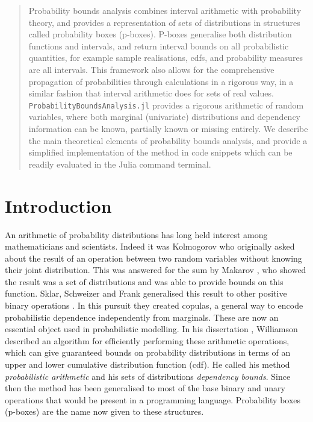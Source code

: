 \documentclass{juliacon}
\begin{document}


\maketitle

\begin{abstract}

Probability bounds analysis combines interval arithmetic with probability theory, and provides a representation of sets of distributions in structures called probability boxes (p-boxes). P-boxes generalise both distribution functions and intervals, and return interval bounds on all probabilistic quantities, for example sample realisations, cdfs, and probability measures are all intervals. This framework also allows for the comprehensive propagation of probabilities through calculations in a rigorous way, in a similar fashion that interval arithmetic does for sets of real values. \texttt{ProbabilityBoundsAnalysis.jl} provides a rigorous arithmetic of random variables, where both marginal (univariate) distributions and dependency information can be known, partially known or missing entirely. We describe the main theoretical elements of probability bounds analysis, and provide a simplified implementation of the method in code snippets which can be readily evaluated in the Julia command terminal.
\end{abstract}

\section{Introduction}
\label{sec:intro}
An arithmetic of probability distributions has long held interest among mathematicians and scientists. Indeed it was Kolmogorov who originally asked about the result of an operation between two random variables without knowing their joint distribution. This was answered for the sum by Makarov \cite{makarov1982estimates}, who showed the result was a set of distributions and was able to provide bounds on this function. Sklar, Schweizer and Frank generalised this result to other positive binary operations \cite{frank1987best,schweizer2011probabilistic}. In this pursuit they created copulas, a general way to encode probabilistic dependence independently from marginals. These are now an essential object used in probabilistic modelling. In his dissertation \cite{williamson1989probabilistic}, Williamson described an algorithm for efficiently performing these arithmetic operations, which can give guaranteed bounds on probability distributions in terms of an upper and lower cumulative distribution function (cdf). He called his method \textit{probabilistic arithmetic} and his sets of distributions \textit{dependency bounds}. Since then the method has been generalised \cite{ferson2015constructing,ferson1996whereof,ferson2004arithmetic} to most of the base binary and unary operations that would be present in a programming language. Probability boxes (p-boxes) are the name now given to these structures.
\end{document}
